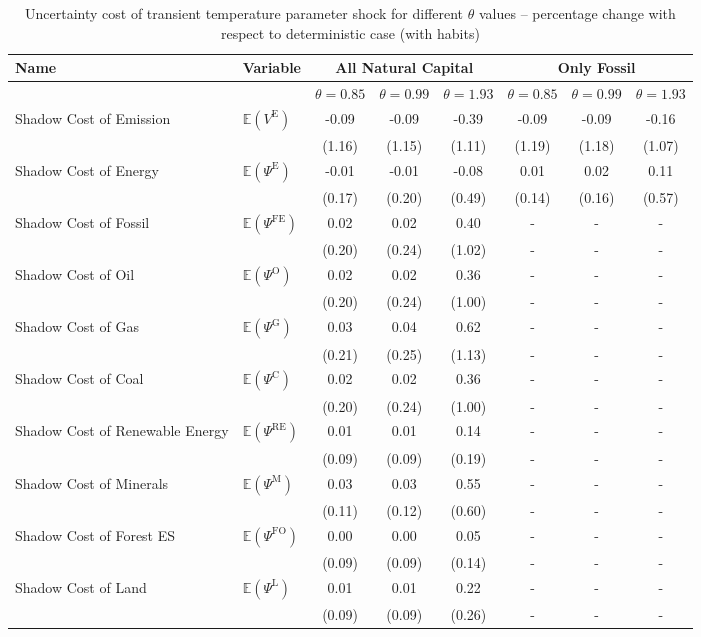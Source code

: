 \begin{table}[h!]
\centering
\begin{tabular}{l l c c c c c c}
\hline
Name & Variable & \multicolumn{3}{c}{All Natural Capital} & \multicolumn{3}{c}{Only Fossil} \\
\hline
 & & $\theta = 0.85$ & $\theta = 0.99$ & $\theta = 1.93$ & $\theta = 0.85$ & $\theta = 0.99$ & $\theta = 1.93$\\
\hline
Shadow Cost of Emission & $\mathbb{E}\!\left(V^{\text{E}}\right)$ & -0.09 & -0.09 & -0.39 & -0.09 & -0.09 & -0.16 \\
 & & (1.16) & (1.15) & (1.11) & (1.19) & (1.18) & (1.07) \\
Shadow Cost of Energy & $\mathbb{E}\!\left(\Psi^{\text{E}}\right)$ & -0.01 & -0.01 & -0.08 & 0.01 & 0.02 & 0.11 \\
 & & (0.17) & (0.20) & (0.49) & (0.14) & (0.16) & (0.57) \\
Shadow Cost of Fossil & $\mathbb{E}\!\left(\Psi^{\text{FE}}\right)$ & 0.02 & 0.02 & 0.40 & - & - & - \\
 & & (0.20) & (0.24) & (1.02) & - & - & - \\
Shadow Cost of Oil & $\mathbb{E}\!\left(\Psi^{\text{O}}\right)$ & 0.02 & 0.02 & 0.36 & - & - & - \\
 & & (0.20) & (0.24) & (1.00) & - & - & - \\
Shadow Cost of Gas & $\mathbb{E}\!\left(\Psi^{\text{G}}\right)$ & 0.03 & 0.04 & 0.62 & - & - & - \\
 & & (0.21) & (0.25) & (1.13) & - & - & - \\
Shadow Cost of Coal & $\mathbb{E}\!\left(\Psi^{\text{C}}\right)$ & 0.02 & 0.02 & 0.36 & - & - & - \\
 & & (0.20) & (0.24) & (1.00) & - & - & - \\
Shadow Cost of Renewable Energy & $\mathbb{E}\!\left(\Psi^{\text{RE}}\right)$ & 0.01 & 0.01 & 0.14 & - & - & - \\
 & & (0.09) & (0.09) & (0.19) & - & - & - \\
Shadow Cost of Minerals & $\mathbb{E}\!\left(\Psi^{\text{M}}\right)$ & 0.03 & 0.03 & 0.55 & - & - & - \\
 & & (0.11) & (0.12) & (0.60) & - & - & - \\
Shadow Cost of Forest ES & $\mathbb{E}\!\left(\Psi^{\text{FO}}\right)$ & 0.00 & 0.00 & 0.05 & - & - & - \\
 & & (0.09) & (0.09) & (0.14) & - & - & - \\
Shadow Cost of Land & $\mathbb{E}\!\left(\Psi^{\text{L}}\right)$ & 0.01 & 0.01 & 0.22 & - & - & - \\
 & & (0.09) & (0.09) & (0.26) & - & - & - \\
\hline
\end{tabular}
\caption{Uncertainty cost of transient temperature parameter shock for different $\theta$ values -- percentage change with respect to deterministic case (with habits)}
\label{tab:paper_table33}
\end{table}
